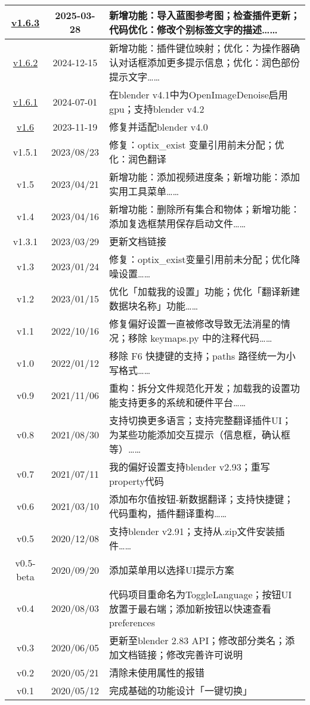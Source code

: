 \documentclass{../../public_resources/doc}
\begin{document}
\begin{longtable}{|*{2}{c|}m{300pt}|}
    \href{https://github.com/Mister-Kin/ToggleLanguage/releases/tag/v1.6.3}{v1.6.3} & 2025-03-28 & 新增功能：导入蓝图参考图；检查插件更新；代码优化：修改个别标签文字的描述……\\
    \hline
    \href{https://github.com/Mister-Kin/ToggleLanguage/releases/tag/v1.6.2}{v1.6.2} & 2024-12-15 & 新增功能：插件键位映射；优化：为操作器确认对话框添加更多提示信息；优化：润色部份提示文字……\\
    \hline
    \href{https://github.com/Mister-Kin/ToggleLanguage/releases/tag/v1.6.1}{v1.6.1} & 2024-07-01 & 在blender v4.1中为OpenImageDenoise启用gpu；支持blender v4.2\\
    \hline
    \href{https://github.com/Mister-Kin/ToggleLanguage/releases/tag/v1.6}{v1.6} & 2023-11-19 & 修复并适配blender v4.0 \\
    \hline
    v1.5.1 & 2023/08/23 & 修复：optix\_exist 变量引用前未分配；优化：润色翻译 \\
    \hline
    v1.5 & 2023/04/21 & 新增功能：添加视频进度条；新增功能：添加实用工具菜单…… \\
    \hline
    v1.4 & 2023/04/16 & 新增功能：删除所有集合和物体；新增功能：添加复选框禁用保存启动文件……\\
    \hline
    v1.3.1 & 2023/03/29 & 更新文档链接 \\
    \hline
    v1.3 & 2023/01/24 & 修复：optix\_exist变量引用前未分配；优化降噪设置……\\
    \hline
    v1.2 & 2023/01/15 & 优化「加载我的设置」功能；优化「翻译新建数据块名称」功能…… \\
    \hline
    v1.1 & 2022/10/16 & 修复偏好设置一直被修改导致无法消星的情况；移除 keymaps.py 中的注释代码…… \\
    \hline
    v1.0 & 2022/01/12 & 移除 F6 快捷键的支持；paths 路径统一为小写格式…… \\
    \hline
    v0.9 & 2021/11/06 & 重构：拆分文件规范化开发；加载我的设置功能支持更多的系统和硬件平台……\\
    \hline
    v0.8 & 2021/08/30 & 支持切换更多语言；支持完整翻译插件UI；为某些功能添加交互提示（信息框，确认框等）…… \\
    \hline
    v0.7 & 2021/07/11 & 我的偏好设置支持blender v2.93；重写property代码 \\
    \hline
    v0.6 & 2021/03/10 & 添加布尔值按钮-新数据翻译；支持快捷键；代码重构，插件翻译重构…… \\
    \hline
    v0.5 & 2020/12/08 & 支持blender v2.91；支持从.zip文件安装插件…… \\
    \hline
    v0.5-beta & 2020/09/20 & 添加菜单用以选择UI提示方案 \\
    \hline
    v0.4 & 2020/08/03 & 代码项目重命名为ToggleLanguage；按钮UI放置于最右端；添加新按钮以快速查看preferences \\
    \hline
    v0.3 & 2020/06/05 & 更新至blender 2.83 API；修改部分类名；添加文档链接；修改完善许可说明 \\
    \hline
    v0.2 & 2020/05/21 & 清除未使用属性的报错 \\
    \hline
    v0.1 & 2020/05/12 & 完成基础的功能设计「一键切换」 \\
    \hline
\end{longtable}
\end{document}
